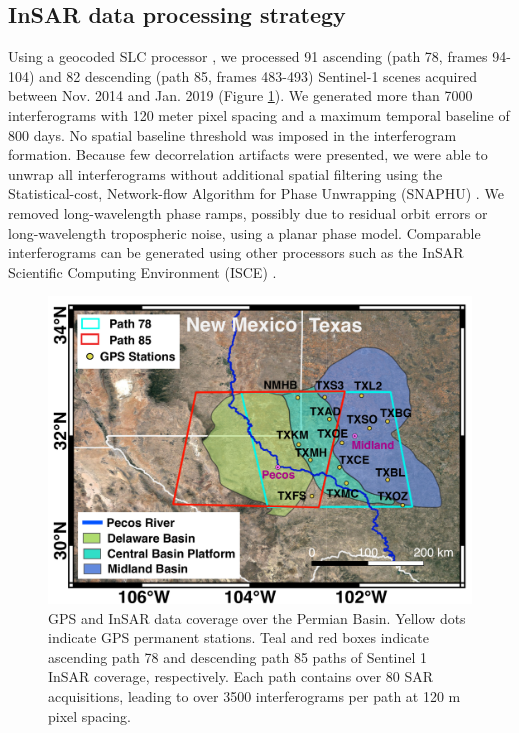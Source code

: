 \documentclass{utexasthesis}
\begin{document}
\subsection{InSAR data processing strategy}
\label{sec:InSARprocessing}
Using a geocoded SLC processor \citep{Zheng2017PhaseCorrectionSingle, Zebker2017UserFriendlyInsar}, we processed 91 ascending (path 78, frames 94-104) and 82 descending (path 85, frames 483-493) Sentinel-1 scenes acquired between Nov. 2014 and Jan. 2019 (Figure \ref{fig:paper1-study-area}). We generated more than 7000 interferograms with 120 meter pixel spacing and a maximum temporal baseline of 800 days. No spatial baseline threshold was imposed in the interferogram formation. Because few decorrelation artifacts were presented, we were able to unwrap all interferograms without additional spatial filtering using the Statistical-cost, Network-flow Algorithm for Phase Unwrapping (SNAPHU) \citep{Chen2001TwoDimensionalPhase}. We removed long-wavelength phase ramps, possibly due to residual orbit errors or long-wavelength tropospheric noise, using a planar phase model. Comparable interferograms can be generated using other processors such as the InSAR Scientific Computing Environment (ISCE) \citep{Rosen2012InsarScientificComputing}. 


\begin{figure}[hbt!]
	\centering
	\includegraphics[width=0.9\linewidth]{paper1-permian/figures/figure1-study-area.pdf}
	\caption[GPS and InSAR data coverage over the Permian Basin.]{GPS and InSAR data coverage over the Permian Basin. Yellow dots indicate GPS permanent stations. Teal and red boxes indicate ascending path 78 and descending path 85 paths of Sentinel 1 InSAR coverage, respectively. Each path contains over 80 SAR acquisitions, leading to over 3500 interferograms per path at 120 m pixel spacing.}
	\label{fig:paper1-study-area}
\end{figure}
\end{document}
